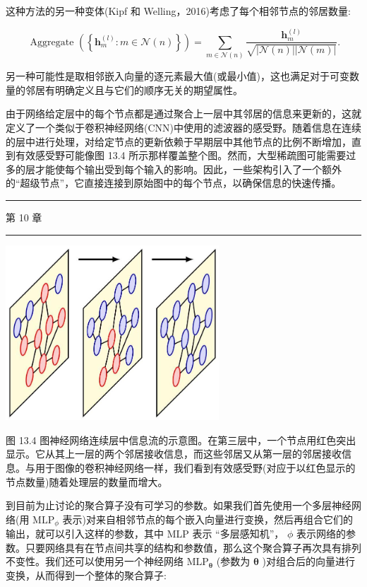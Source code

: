 \documentclass[10pt]{article}
\newcommand{\HRule}{\begin{center}\rule{0.9\linewidth}{0.2mm}\end{center}}
\begin{document}
这种方法的另一种变体(Kipf 和 Welling，2016)考虑了每个相邻节点的邻居数量:

\[
\text{ Aggregate }\left( \left\{  {{\mathbf{h}}_{m}^{\left( l\right) } : m \in  \mathcal{N}\left( n\right) }\right\}  \right)  = \mathop{\sum }\limits_{{m \in  \mathcal{N}\left( n\right) }}\frac{{\mathbf{h}}_{m}^{\left( l\right) }}{\sqrt{\left| {\mathcal{N}\left( n\right) }\right| \left| {\mathcal{N}\left( m\right) }\right| }}. \tag{13.14}
\]

另一种可能性是取相邻嵌入向量的逐元素最大值(或最小值)，这也满足对于可变数量的邻居有明确定义且与它们的顺序无关的期望属性。

由于网络给定层中的每个节点都是通过聚合上一层中其邻居的信息来更新的，这就定义了一个类似于卷积神经网络(CNN)中使用的滤波器的感受野。随着信息在连续的层中进行处理，对给定节点的更新依赖于早期层中其他节点的比例不断增加，直到有效感受野可能像图 13.4 所示那样覆盖整个图。然而，大型稀疏图可能需要过多的层才能使每个输出受到每个输入的影响。因此，一些架构引入了一个额外的“超级节点”，它直接连接到原始图中的每个节点，以确保信息的快速传播。

\HRule

第 10 章

\HRule

\begin{center}
\includegraphics[max width=0.6\textwidth]{images/0194e279-9b28-703a-88f4-c3ac21e2010d_436_809_343_747_612_0.jpg}
\end{center}
\hspace*{3em} 

图 13.4 图神经网络连续层中信息流的示意图。在第三层中，一个节点用红色突出显示。它从其上一层的两个邻居接收信息，而这些邻居又从第一层的邻居接收信息。与用于图像的卷积神经网络一样，我们看到有效感受野(对应于以红色显示的节点数量)随着处理层的数量而增大。

到目前为止讨论的聚合算子没有可学习的参数。如果我们首先使用一个多层神经网络(用 \({\mathrm{{MLP}}}_{\phi }\) 表示)对来自相邻节点的每个嵌入向量进行变换，然后再组合它们的输出，就可以引入这样的参数，其中 MLP 表示 “多层感知机”， \(\phi\) 表示网络的参数。只要网络具有在节点间共享的结构和参数值，那么这个聚合算子再次具有排列不变性。我们还可以使用另一个神经网络 \({\mathrm{{MLP}}}_{\mathbf{\theta }}\) (参数为 \(\mathbf{\theta }\) )对组合后的向量进行变换，从而得到一个整体的聚合算子:
\end{document}
